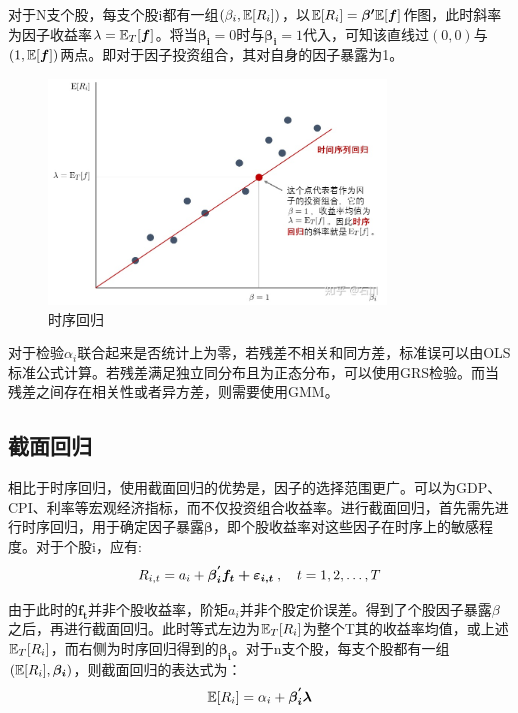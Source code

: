 \documentclass[11pt]{article}
\begin{document}
对于N支个股，每支个股i都有一组$(\beta_i,\mathbb{E}[R_i])$，以$\mathbb{E}[R_i] = \bm{\beta'} \mathbb{E}[\bm{f}]$作图，此时斜率为因子收益率$\lambda=\mathbb{E}_T[\bm{f}]$。将当$\bm{\beta_i}=0$时与$\bm{\beta_i}=1$代入，可知该直线过$(0,0)$与$(1,\mathbb{E}[\bm{f}])$两点。即对于因子投资组合，其对自身的因子暴露为1。

\begin{figure}[H]
    \centering
    \includegraphics[width=0.8\textwidth]{fig/ts_reg.jpg}
    \caption{时序回归}
    \label{fig：ts_reg}
\end{figure}

对于检验$\alpha_i$联合起来是否统计上为零，若残差不相关和同方差，标准误可以由OLS标准公式计算。若残差满足独立同分布且为正态分布，可以使用GRS检验。而当残差之间存在相关性或者异方差，则需要使用GMM。

\subsection{截面回归}

相比于时序回归，使用截面回归的优势是，因子的选择范围更广。可以为GDP、CPI、利率等宏观经济指标，而不仅投资组合收益率。进行截面回归，首先需先进行时序回归，用于确定因子暴露$\bm{\beta}$，即个股收益率对这些因子在时序上的敏感程度。对于个股i，应有:
\begin{equation*}
    R_{i,t} = a_i + \bm{\beta_{i}^{'} f_t + \varepsilon_{i,t}} \:,\quad t=1,2,\dots,T
\end{equation*}

由于此时的$\bm{f_t}$并非个股收益率，阶矩$a_i$并非个股定价误差。得到了个股因子暴露$\beta$之后，再进行截面回归。此时等式左边为$\mathbb{E}_T[R_i]$为整个T其的收益率均值，或上述$\mathbb{E}_T[R_i]$，而右侧为时序回归得到的$\bm{\beta_i}$。对于n支个股，每支个股都有一组$(\mathbb{E}[R_i],\bm{\beta_i})$，则截面回归的表达式为：
\begin{equation*}
    \mathbb{E}[R_i] = \alpha_i + \bm{\beta_{i}^{'} \lambda}
\end{equation*}
\end{document}
